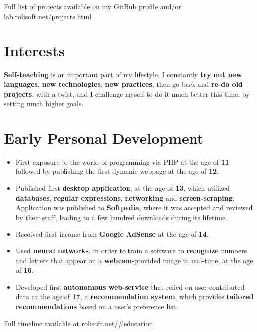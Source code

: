 \documentclass[11pt,a4paper,sans]{moderncv}
\renewcommand*{\httplink}[2][]{%
	\ifthenelse{\equal{#1}{}}%
	{\href{https://#2}{#2}}%
	{\href{https://#2}{#1}}}
\begin{document}
	\vspace{6pt}

	Full list of projects available on my GitHub profile and/or \httplink{lab.rolisoft.net/projects.html}

\section{Interests}
	\textbf{Self-teaching} is an important part of my lifestyle, I constantly \textbf{try out new languages}, \textbf{new technologies}, \textbf{new practices}, then go back and \textbf{re-do old projects}, with a twist, and I challenge myself to do it much better this time, by setting much higher goals.

\section{Early Personal Development}

	\begin{itemize}
		\item	First exposure to the world of programming via PHP at the age of \textbf{11} followed by publishing the first dynamic webpage at the age of \textbf{12}.
		\item	Published first \textbf{desktop application}, at the age of \textbf{13}, which utilized \textbf{databases}, \textbf{regular expressions}, \textbf{networking} and \textbf{screen-scraping}. Application was published to \textbf{Softpedia}, where it was accepted and reviewed by their staff, leading to a few hundred downloads during its lifetime.
		\item	Received first income from \textbf{Google AdSense} at the age of \textbf{14}.
		\item	Used \textbf{neural networks}, in order to train a software to \textbf{recognize} numbers and letters that appear on a \textbf{webcam}-provided image in real-time, at the age of \textbf{16}.
		\item	Developed first \textbf{autonomous web-service} that relied on user-contributed data at the age of \textbf{17}, a \textbf{recommendation system}, which provides \textbf{tailored recommendations} based on a user's preference list.
	\end{itemize}

	\vspace{6pt}

	Full timeline available at \httplink{rolisoft.net/\#education}
\end{document}
